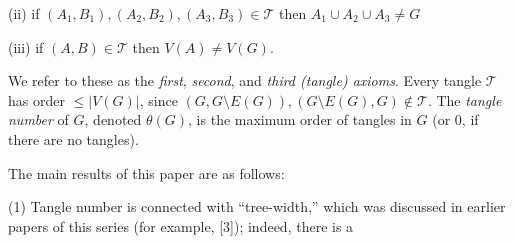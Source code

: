 \hspace*{12pt}(ii) if $(A_1, B_1), (A_2, B_2), (A_3, B_3) \in \mathscr{T}$ then $A_1 \cup A_2 \cup A_3 \ne G$

\hspace*{12pt}(iii) if $(A, B) \in \mathscr{T}$ then $V(A) \ne V(G)$.

We refer to these as the \textit{first}, \textit{second}, and \textit{third (tangle) axioms}. Every tangle $\mathscr{T}$ has order $\le |V(G)|$, since $(G, G \setminus E(G)), (G \setminus E(G), G) \notin \mathscr{T}$. The \textit{tangle number} of $G$, denoted $\theta(G)$, is the maximum order of tangles in $G$ (or 0, if there are no tangles).

The main results of this paper are as follows:

\hspace*{12pt}(1) Tangle number is connected with ``tree-width,'' which was discussed in earlier papers of this series (for example, [3]); indeed, there is a
